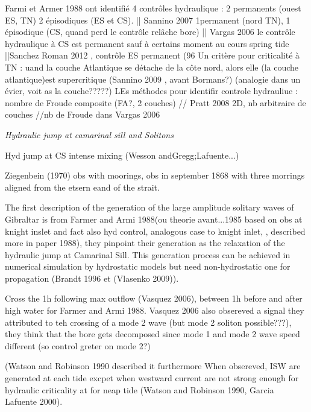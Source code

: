 Farmi et Armer 1988 ont identifié 4 contrôles hydraulique : 2 permanents (ouest ES, TN) 2 épisodiques (ES et CS). || Sannino 2007 1permanent (nord TN), 1 épisodique (CS, quand perd le contrôle relâche bore) || Vargas 2006 le contrôle hydraulique à CS est permanent sauf à certains moment au cours spring tide ||Sanchez Roman 2012 , contrôle ES permanent (96%
Un critère pour criticalité à TN : uand la couche Atlantique se détache de la côte nord, alors elle (la couche atlantique)est supercritique (Sannino 2009 , avant Bormans?) (analogie dans un évier, voit as la couche?????)
LEs méthodes pour identifir controle hydrauliue : nombre de Froude composite (FA?, 2 couches) // Pratt 2008 2D, nb arbitraire de couches //nb de Froude dans Vargas 2006



\textit{Hydraulic jump at camarinal sill and Solitons}

Hyd jump at CS intense mixing (Wesson andGregg;Lafuente...)

Ziegenbein (1970) obs with moorings, obs in september 1868 with three morrings aligned from the etsern eand of the strait. 

The first description of the generation of the large amplitude solitary waves of Gibraltar is from Farmer and Armi 1988(ou theorie avant...1985 based on obs at knight inslet and fact also hyd control, analogous case to knight inlet, , described more in paper 1988), they pinpoint their generation as the relaxation of the hydraulic jump at Camarinal Sill. This generation process can be achieved in numerical simulation by hydrostatic models but need non-hydrostatic one for propagation (Brandt 1996 et (Vlasenko 2009)).

Cross the 1h following max outflow (Vasquez 2006), between 1h before and after high water for Farmer and Armi 1988. Vasquez 2006 also obsereved a signal they attributed to teh crossing of a mode 2 wave (but mode 2 soliton possible???), they think that the bore gets decomposed since mode 1 and mode 2 wave speed different (so control greter on mode 2?)

(Watson and Robinson 1990 described it furthermore
When obsereved, ISW are generated at each tide excpet when westward current are not strong enough for hydraulic criticality at for neap tide (Watson and Robinson 1990, Garcia Lafuente 2000). 


